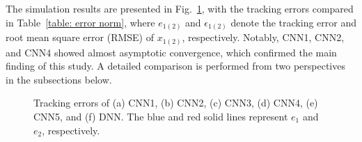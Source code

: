 \documentclass{l4dc2025}
\begin{document}
The simulation results are presented in Fig.~\ref{fig:sim}, with the tracking errors compared in Table~\ref{table: error norm}, where $e_{1(2)}$ and $\epsilon_{1(2)}$ denote the tracking error and root mean square error (RMSE) of $x_{1(2)}$, respectively. Notably, CNN1, CNN2, and CNN4 showed almost asymptotic convergence, which confirmed the main finding of this study. A detailed comparison is performed from two perspectives in the subsections below.


\begin{figure}%
    \centering
    \hfill
    \hfill
    \vfill
    \hfill
    \hfill
    \caption{Tracking errors of (a) CNN1, (b) CNN2, (c) CNN3, (d) CNN4, (e) CNN5, and (f) DNN. The blue and red solid lines represent $e_1$ and $e_2$, respectively.}
    \label{fig:sim}
\end{figure}
\end{document}
